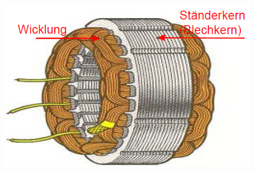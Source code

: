 \begin{minipage}[b]{0.33\linewidth}
	\includegraphics[scale = 0.4]{images/AsynchronmotorStaenderkern}
\end{minipage}\\
